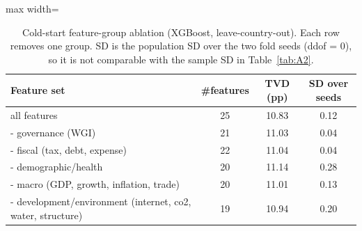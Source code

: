 \begin{table}[H]
\caption{Cold-start feature-group ablation (XGBoost, leave-country-out). Each row removes one group. SD is the population SD over the two fold seeds (ddof = 0), so it is not comparable with the sample SD in Table~\ref{tab:A2}.}\label{tab:ablation}
\centering\footnotesize
\renewcommand{\arraystretch}{1.0}
\begin{adjustbox}{max width=\linewidth}
\begin{tabular}{lccc}
\toprule
Feature set & \#features & TVD (pp) & SD over seeds \\
\midrule
all features & 25 & 10.83 & 0.12 \\
- governance (WGI) & 21 & 11.03 & 0.04 \\
- fiscal (tax, debt, expense) & 22 & 11.04 & 0.04 \\
- demographic/health & 20 & 11.14 & 0.28 \\
- macro (GDP, growth, inflation, trade) & 20 & 11.01 & 0.13 \\
- development/environment (internet, co2, water, structure) & 19 & 10.94 & 0.20 \\
\bottomrule
\end{tabular}\end{adjustbox}
\end{table}
